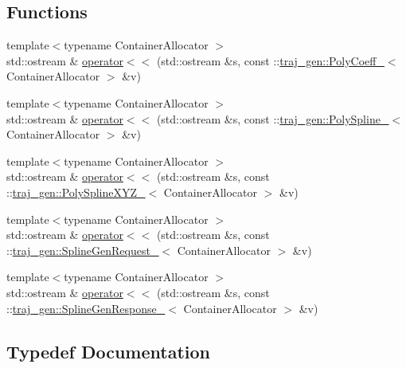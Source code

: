\subsection*{Functions}
\begin{DoxyCompactItemize}
\item 
{\footnotesize template$<$typename Container\+Allocator $>$ }\\std\+::ostream \& \hyperlink{namespacetraj__gen_a5327b1878a9e8063138755821c262887}{operator$<$$<$} (std\+::ostream \&s, const \+::\hyperlink{structtraj__gen_1_1_poly_coeff__}{traj\+\_\+gen\+::\+Poly\+Coeff\+\_\+}$<$ Container\+Allocator $>$ \&v)
\item 
{\footnotesize template$<$typename Container\+Allocator $>$ }\\std\+::ostream \& \hyperlink{namespacetraj__gen_aad0a340a35c67cabfb1ac670bcd62760}{operator$<$$<$} (std\+::ostream \&s, const \+::\hyperlink{structtraj__gen_1_1_poly_spline__}{traj\+\_\+gen\+::\+Poly\+Spline\+\_\+}$<$ Container\+Allocator $>$ \&v)
\item 
{\footnotesize template$<$typename Container\+Allocator $>$ }\\std\+::ostream \& \hyperlink{namespacetraj__gen_afb6f12d3a1b7cf4e72427d1f3fcc04cc}{operator$<$$<$} (std\+::ostream \&s, const \+::\hyperlink{structtraj__gen_1_1_poly_spline_x_y_z__}{traj\+\_\+gen\+::\+Poly\+Spline\+X\+Y\+Z\+\_\+}$<$ Container\+Allocator $>$ \&v)
\item 
{\footnotesize template$<$typename Container\+Allocator $>$ }\\std\+::ostream \& \hyperlink{namespacetraj__gen_ae8b92b51a80484d2885ec2fef5c9946b}{operator$<$$<$} (std\+::ostream \&s, const \+::\hyperlink{structtraj__gen_1_1_spline_gen_request__}{traj\+\_\+gen\+::\+Spline\+Gen\+Request\+\_\+}$<$ Container\+Allocator $>$ \&v)
\item 
{\footnotesize template$<$typename Container\+Allocator $>$ }\\std\+::ostream \& \hyperlink{namespacetraj__gen_ab345560c1fc43b1c77739f530a2581f2}{operator$<$$<$} (std\+::ostream \&s, const \+::\hyperlink{structtraj__gen_1_1_spline_gen_response__}{traj\+\_\+gen\+::\+Spline\+Gen\+Response\+\_\+}$<$ Container\+Allocator $>$ \&v)
\end{DoxyCompactItemize}


\subsection{Typedef Documentation}
